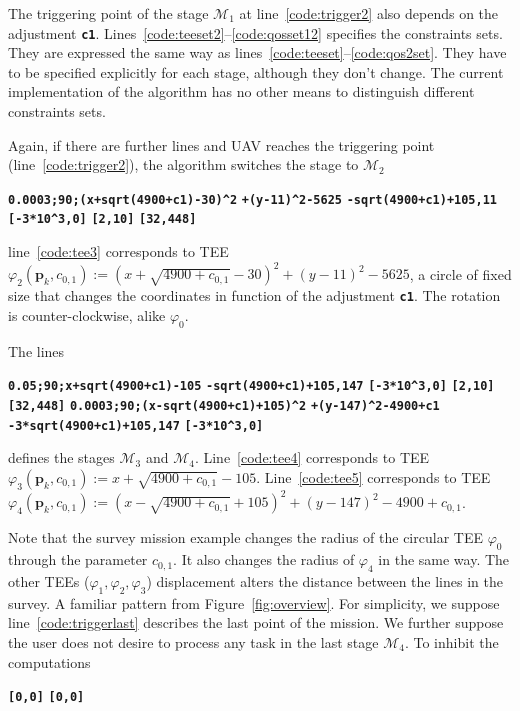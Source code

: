 \documentclass[letterpaper,10pt,conference]{ieeeconf}
\theoremstyle{definition}
\begin{document}
The triggering point of the stage $\mathcal{M}_1$ at line~\ref{code:trigger2} also depends on the adjustment {\tt\textbf{c1}}. Lines~\ref{code:teeset2}--\ref{code:qosset12} specifies the constraints sets. They are expressed the same way as lines~\ref{code:teeset}--\ref{code:qos2set}. They have to be specified explicitly for each stage, although they don't change. The current implementation of the algorithm has no other means to distinguish different constraints sets. 

Again, if there are further lines and UAV reaches the triggering point (line~\ref{code:trigger2}), the algorithm switches the stage to $\mathcal{M}_2$
\begin{algorithmic}[1]
  \State\textbf{\texttt{0.0003;90;(x+sqrt(4900+c1)-30)\^{}2}}
  \textbf{\texttt{\hspace*{14ex}+(y-11)\^{}2-5625}}\label{code:tee3}
  \State\textbf{\texttt{-sqrt(4900+c1)+105,11}}
  \State\textbf{\texttt{[-3*10\^{}3,0]}}
  \State\textbf{\texttt{[2,10]}}
  \State\textbf{\texttt{[32,448]}}\label{code:qosset32}
\end{algorithmic}
line~\ref{code:tee3} corresponds to TEE $\varphi_2(\mathbf{p}_k,c_{0,1}):=(x+\sqrt{4900+c_{0,1}}-30)^2+(y-11)^2-5625$, a circle of fixed size that changes the coordinates in function of the adjustment {\tt\textbf{c1}}. The rotation is counter-clockwise, alike $\varphi_0$.

The lines
\begin{algorithmic}[1]
  \State\textbf{\texttt{0.05;90;x+sqrt(4900+c1)-105}}\label{code:tee4}
  \State\textbf{\texttt{-sqrt(4900+c1)+105,147}}
  \State\textbf{\texttt{[-3*10\^{}3,0]}}
  \State\textbf{\texttt{[2,10]}}
  \State\textbf{\texttt{[32,448]}}\label{code:qosset42}
  \State\textbf{\texttt{0.0003;90;(x-sqrt(4900+c1)+105)\^{}2}}
  \textbf{\texttt{\hspace*{14ex}+(y-147)\^{}2-4900+c1}}\label{code:tee5}
  \State\textbf{\texttt{-3*sqrt(4900+c1)+105,147}}\label{code:triggerlast}
  \State\textbf{\texttt{[-3*10\^{}3,0]}}\label{code:teeset5}
\end{algorithmic}
defines the stages $\mathcal{M}_3$ and $\mathcal{M}_4$. Line~\ref{code:tee4} corresponds to TEE $\varphi_3(\mathbf{p}_k,c_{0,1}):=x+\sqrt{4900+c_{0,1}}-105$. Line~\ref{code:tee5} corresponds to TEE $\varphi_4(\mathbf{p}_k,c_{0,1}):=(x-\sqrt{4900+c_{0,1}}+105)^2+(y-147)^2-4900+c_{0,1}$.

Note that the survey mission example changes the radius of the circular TEE $\varphi_0$ through the parameter $c_{0,1}$. It also changes the radius of $\varphi_4$ in the same way. The other TEEs ($\varphi_1,\varphi_2,\varphi_3$) displacement alters the distance between the lines in the survey. A familiar pattern from Figure~\ref{fig:overview}. For simplicity, we suppose line~\ref{code:triggerlast} describes the last point of the mission. We further suppose the user does not desire to process any task in the last stage $\mathcal{M}_4$. To inhibit the computations
\begin{algorithmic}[1]
  \State\textbf{\texttt{[0,0]}}
  \State\textbf{\texttt{[0,0]}}
\end{algorithmic}
\end{document}
